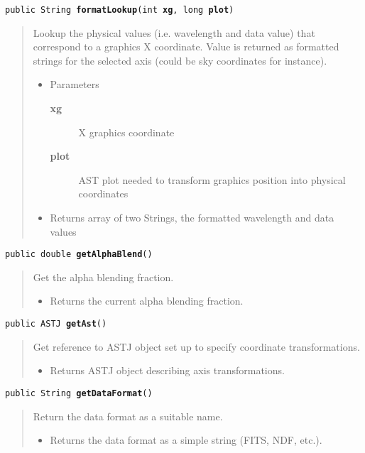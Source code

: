 \documentclass[twoside,11pt,nolof]{starlink}
\providecommand{\method}[1]{\texttt{#1}}
\newenvironment{desc}{\begin{quote}}{\end{quote}}
\begin{document}
\method{public String \textbf{formatLookup}(\texttt{int} \textbf{xg}, \texttt{long} \textbf{plot})\label{l43}\label{l44}}
\begin{desc}Lookup the physical values (i.e. wavelength and data value)
 that correspond to a graphics X coordinate. Value is returned
 as formatted strings for the selected axis (could be sky
 coordinates for instance).
\begin{itemize}
\item{Parameters
  \begin{description}
   \item[\textbf{xg}]{X graphics coordinate}
   \item[\textbf{plot}]{AST plot needed to transform graphics position
             into physical coordinates}
  \end{description}}
\end{itemize}
\begin{itemize}
\item{Returns array of two Strings, the formatted wavelength and
         data values }
\end{itemize}
\end{desc}

\method{public double \textbf{getAlphaBlend}()\label{l45}\label{l46}}
\begin{desc}Get the alpha blending fraction.
\begin{itemize}
\item{Returns the current alpha blending fraction. }
\end{itemize}
\end{desc}

\method{public ASTJ \textbf{getAst}()\label{l47}\label{l48}}
\begin{desc}Get reference to ASTJ object set up to specify coordinate
 transformations.
\begin{itemize}
\item{Returns ASTJ object describing axis transformations. }
\end{itemize}
\end{desc}

\method{public String \textbf{getDataFormat}()\label{l49}\label{l50}}
\begin{desc}Return the data format as a suitable name.
\begin{itemize}
\item{Returns the data format as a simple string (FITS, NDF, etc.). }
\end{itemize}
\end{desc}
\end{document}
